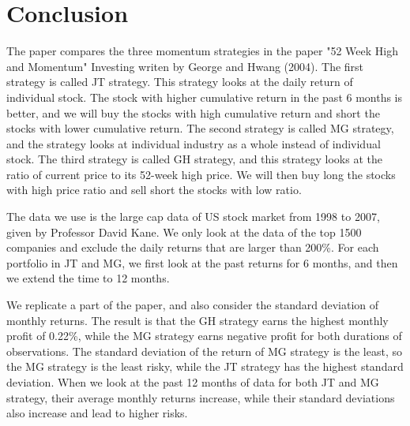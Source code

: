 \documentclass{article}
\begin{document}
\section{Conclusion}                       
                                           
The paper compares the three momentum strategies in the paper "52 Week High and Momentum" Investing writen by George and Hwang (2004). The first strategy is called JT strategy. This strategy looks at the daily return of individual stock. The stock with higher cumulative return in the past 6 months is better, and we will buy the stocks with high cumulative return and short the stocks with lower cumulative return. The second strategy is called MG strategy, and the strategy looks at individual industry as a whole instead of individual stock. The third strategy is called GH strategy, and this strategy looks at the ratio of current price to its 52-week high price. We will then buy long the stocks with high price ratio and sell short the stocks with low ratio.                
                      
The data we use is the large cap data of US stock market from 1998 to 2007, given by Professor David Kane. We only look at the data of the top 1500 companies and exclude the daily returns that are larger than 200\%. For each portfolio in JT and MG, we first look at the past returns for 6 months, and then we extend the time to 12 months. 

We replicate a part of the paper, and also consider the standard deviation of monthly returns. The result is that the GH strategy earns the highest monthly profit of 0.22\%, while the MG strategy earns negative profit for both durations of observations. The standard deviation of the return of MG strategy is the least, so the MG strategy is the least risky, while the JT strategy has the highest standard deviation. When we look at the past 12 months of data for both JT and MG strategy, their average monthly returns increase, while their standard deviations also increase and lead to higher risks.
\end{document}
